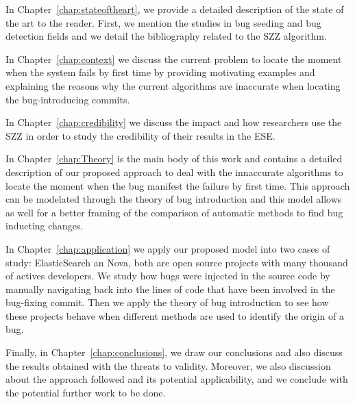 \documentclass[a4paper, 12pt]{book}
\begin{document}
In Chapter~\ref{chap:stateoftheart}, we provide a detailed description of the state of the art to the reader. First, we mention the studies in bug seeding and bug detection fields and we detail the bibliography related to the SZZ algorithm.

In Chapter~\ref{chap:context} we discuss the current problem to locate the moment when the system fails by first time by providing motivating examples and explaining the reasons why the current algorithms are inaccurate when locating the bug-introducing commits.

In Chapter~\ref{chap:credibility} we discuss the impact and how researchers use the SZZ in order to study the credibility of their results in the ESE.

In Chapter~\ref{chap:Theory} is the main body of this work and contains a detailed description of our proposed approach to deal with the innaccurate algorithms to locate the moment when the bug manifest the failure by first time. This approach can be modelated through the theory of bug introduction and this model allows as well for a better framing of the comparison of automatic methods to find bug inducting changes.

In Chapter~\ref{chap:application} we apply our proposed model into two cases of study: ElasticSearch an Nova, both are open source projects with many thousand of actives developers. We study how bugs were injected in the source code by manually navigating back into the lines of code that have been involved in the bug-fixing commit. Then we apply the theory of bug introduction to see how these projects behave when different methods are used to identify the origin of a bug. %

Finally, in Chapter~\ref{chap:conclusions}, we draw our conclusions and also discuss the results obtained with the threats to validity. Moreover, we also discussion about the approach followed and its potential applicability, and we conclude with the potential further work to be done.

\end{document}

